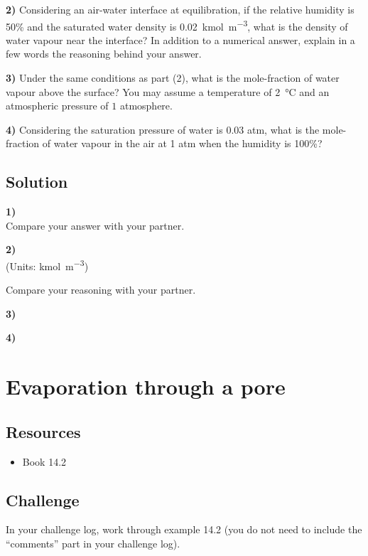 \textbf{2)} Considering an air-water interface at equilibration, if the relative humidity is 50\% and the saturated water density is \SI{0.02}{\kmol\per\cubic\meter}, what is the density of water vapour near the interface? In addition to a numerical answer, explain in a few words the reasoning behind your answer.

\textbf{3)} Under the same conditions as part (2), what is the mole-fraction of water vapour above the surface? You may assume a temperature of \SI{2}{\celsius} and an atmospheric pressure of $1$ atmosphere.

\textbf{4)} Considering the saturation pressure of water is 0.03 atm, what is the mole-fraction of water vapour in the air at 1 atm when the humidity is 100\%?

\subsection*{Solution}
\textbf{1)}\\
Compare your answer with your partner.

\textbf{2)}\\
(Units: \si{\kmol\per\cubic\meter})\\

Compare your reasoning with your partner.

\textbf{3)}\\

\textbf{4)}\\




\newpage
\section{Evaporation through a pore}

\subsection*{Resources}
\begin{itemize}
    \item Book 14.2
\end{itemize}

\subsection*{Challenge}
In your challenge log, work through example 14.2 (you do not need to include the ``comments'' part in your challenge log).




